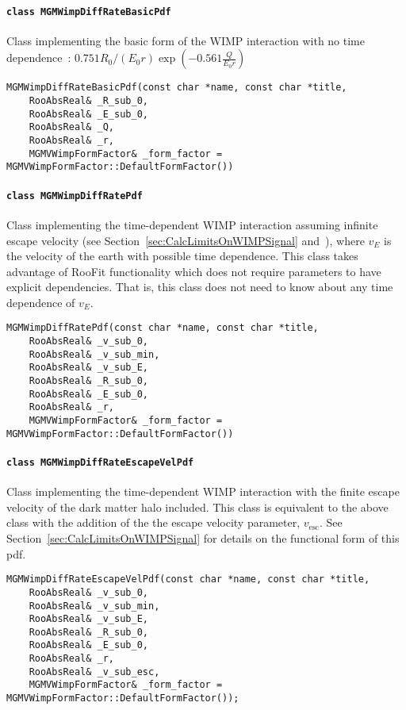 			\paragraph{\lstinline!class MGMWimpDiffRateBasicPdf!}
Class implementing the basic form of the WIMP interaction with no time dependence~\cite{Lew96}: $0.751 R_{0}/(E_{0} r) \exp(-0.561 \frac{Q}{E_{0} r })$
				\begin{lstlisting}
MGMWimpDiffRateBasicPdf(const char *name, const char *title,
	RooAbsReal& _R_sub_0,
	RooAbsReal& _E_sub_0,
	RooAbsReal& _Q,
	RooAbsReal& _r,
	MGMVWimpFormFactor& _form_factor = MGMVWimpFormFactor::DefaultFormFactor())
				\end{lstlisting}	

			\paragraph{\lstinline!class MGMWimpDiffRatePdf!}
Class implementing the time-dependent WIMP interaction assuming infinite escape velocity (see Section~\ref{sec:CalcLimitsOnWIMPSignal} and~\cite{Jun96,Lew96}), where $v_{E}$ is the velocity of the earth with possible time dependence.  This class takes advantage of RooFit functionality which does not require parameters to have explicit dependencies.  That is, this class does not need to know about any time dependence of $v_{E}$.
				\begin{lstlisting}
MGMWimpDiffRatePdf(const char *name, const char *title,
	RooAbsReal& _v_sub_0,
	RooAbsReal& _v_sub_min,
	RooAbsReal& _v_sub_E,
	RooAbsReal& _R_sub_0,
	RooAbsReal& _E_sub_0,
	RooAbsReal& _r,
	MGMVWimpFormFactor& _form_factor = MGMVWimpFormFactor::DefaultFormFactor())
				\end{lstlisting}	
						
			\paragraph{\lstinline!class MGMWimpDiffRateEscapeVelPdf!}
Class implementing the time-dependent WIMP interaction with the finite escape velocity of the dark matter halo included.  This class is equivalent to the above class with the addition of the the escape velocity parameter, $v_{\text{esc}}$.  See Section~\ref{sec:CalcLimitsOnWIMPSignal} for details on the functional form of this pdf.
				\begin{lstlisting}
MGMWimpDiffRateEscapeVelPdf(const char *name, const char *title,
	RooAbsReal& _v_sub_0,
	RooAbsReal& _v_sub_min,
	RooAbsReal& _v_sub_E,
	RooAbsReal& _R_sub_0,
	RooAbsReal& _E_sub_0,
	RooAbsReal& _r,
	RooAbsReal& _v_sub_esc,
	MGMVWimpFormFactor& _form_factor = MGMVWimpFormFactor::DefaultFormFactor());
				\end{lstlisting}	

